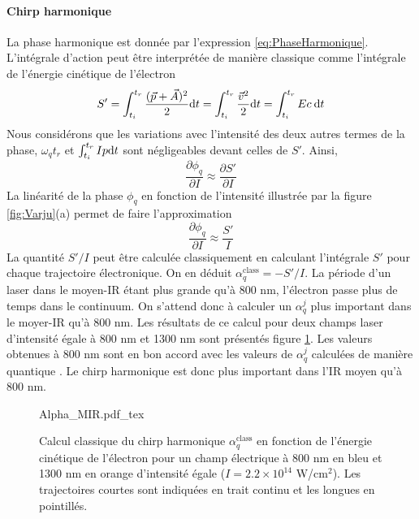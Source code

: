\paragraph{Chirp harmonique} La phase harmonique est donnée par l'expression \ref{eq:PhaseHarmonique}. L'intégrale d'action peut être interprétée de manière classique comme l'intégrale de l'énergie cinétique de l'électron 
\begin{equation}
S' = \int_{t_i}^{t_r} \frac{(\vec{p}+\vec{A})^2}{2} \mathrm{d} t = \int_{t_i}^{t_r} \frac{\vec{v}^2}{2} \mathrm{d} t = \int_{t_i}^{t_r} Ec \: \mathrm{d} t
\end{equation}
Nous considérons que les variations avec l'intensité des deux autres termes de la phase, $\omega_q t_r$ et $\int_{t_i}^{t_r} Ip \mathrm{d} t$ sont négligeables devant celles de $S'$. Ainsi, 
\begin{equation}
\frac{\partial \phi_q}{\partial I} \approx \frac{\partial S'}{\partial I}
\end{equation}
La linéarité de la phase $\phi_q$ en fonction de l'intensité illustrée par la figure \ref{fig:Varju}(a) permet de faire l'approximation
\begin{equation}
\frac{\partial \phi_q}{\partial I} \approx \frac{S'}{I}
\end{equation}
La quantité $S'/I$ peut être calculée classiquement en calculant l'intégrale $S'$ pour chaque trajectoire électronique. On en déduit $\alpha_q^{\text{class}} = - S'/I$. La période d'un laser dans le moyen-IR étant plus grande qu'à 800 nm, l'électron passe plus de temps dans le continuum. On s'attend donc à calculer un $\alpha_q^j$ plus important dans le moyer-IR qu'à 800 nm. Les résultats de ce calcul pour deux champs laser d'intensité égale à 800 nm et 1300 nm sont présentés figure \ref{fig:AlphaMIR}. Les valeurs obtenues à 800 nm sont en bon accord avec les valeurs de $\alpha_q^j$ calculées de manière quantique . Le chirp harmonique est donc plus important dans l'IR moyen qu'à 800 nm.

\begin{figure}
\centering
\def\svgwidth{0.7\columnwidth}
{Alpha_MIR.pdf_tex}
\caption{Calcul classique du chirp harmonique $\alpha_q^{\text{class}}$ en fonction de l'énergie cinétique de l'électron pour un champ électrique à 800 nm en bleu et 1300 nm en orange d'intensité égale ($I = 2.2 \times 10^{14}$ W/cm$^2$). Les trajectoires courtes sont indiquées en trait continu et les longues en pointillés.}
\label{fig:AlphaMIR}
\end{figure}

